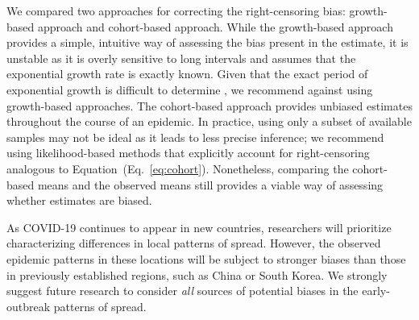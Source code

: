 \documentclass[12pt]{article}
\newcommand{\eref}[1]{(Eq.~\ref{eq:#1})}
\begin{document}
We compared two approaches for correcting the right-censoring bias: growth-based approach and cohort-based approach.
While the growth-based approach provides a simple, intuitive way of assessing the bias present in the estimate, it is unstable as it is overly sensitive to long intervals and assumes that the exponential growth rate is exactly known.
Given that the exact period of exponential growth is difficult to determine \citep{ma2014estimating}, we recommend against using growth-based approaches.
The cohort-based approach provides unbiased estimates throughout the course of an epidemic.
In practice, using only a subset of available samples may not be ideal as it leads to less precise inference;
we recommend using likelihood-based methods that explicitly account for right-censoring analogous to Equation~\eref{cohort}.
Nonetheless, comparing the cohort-based means and the observed means still provides a viable way of assessing whether estimates are biased.

As COVID-19 continues to appear in new countries, researchers will prioritize characterizing differences in local patterns of spread.
However, the observed epidemic patterns in these locations will be subject to stronger biases than those in previously established regions, such as China or South Korea.
We strongly suggest future research to consider \emph{all} sources of potential biases in the early-outbreak patterns of spread.


\end{document}
